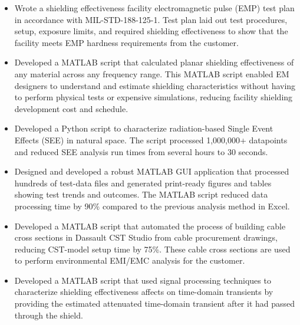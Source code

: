 \documentclass[letterpaper,12pt]{article}
\newcommand{\simpleParagraph}[1]{
    \vspace{-1pt}
    \begin{adjustwidth}{7pt}{0pt}
        #1
    \end{adjustwidth}
}
\newcommand{\matlab}[0]{
    MATLAB
}
\begin{document}
    \simpleParagraph{
        \begin{itemize}
            \item Wrote a shielding effectiveness facility electromagnetic pulse (EMP) test plan in
                accordance with MIL-STD-188-125-1. Test plan laid out test procedures, setup, exposure
                limits, and required shielding effectiveness to show that the facility meets EMP 
                hardness requirements from the customer.

            \item Developed a \matlab script that calculated planar shielding effectiveness of any
                material across any frequency range. This \matlab script enabled EM designers to understand
                and estimate shielding characteristics without having to perform physical tests or expensive 
                simulations, reducing facility shielding development cost and schedule.

            \item Developed a Python script to characterize radiation-based Single Event Effects (SEE) in
                natural space. The script processed 1,000,000+ datapoints and reduced SEE analysis
                run times from several hours to 30 seconds.

            \item Designed and developed a robust \matlab GUI application that processed hundreds
                of test-data files and generated print-ready figures and tables showing test trends and outcomes.
                The \matlab script reduced data processing time by 90\% compared to the previous analysis 
                method in Excel.

            \item Developed a MATLAB script that automated the process of building cable cross sections
                in Dassault CST Studio from cable procurement drawings, reducing CST-model setup time by 75\%.
                These cable cross sections are used to perform environmental EMI/EMC analysis for the 
                customer.

            \item Developed a MATLAB script that used signal processing techniques to characterize
                shielding effectiveness affects on time-domain transients by providing the estimated 
                attenuated time-domain transient after it had passed through the shield.


        \end{itemize}
    }
\end{document}
